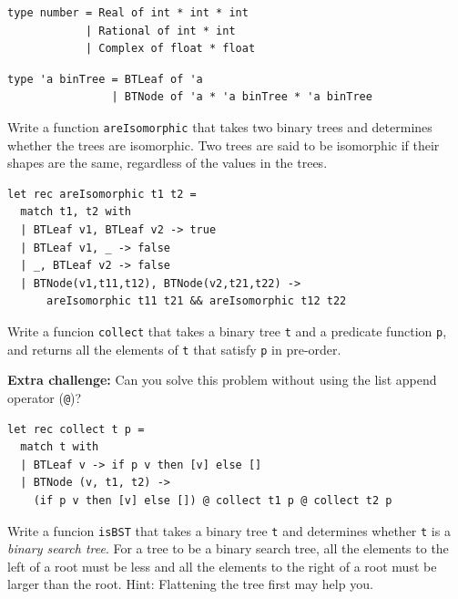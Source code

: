\documentclass[addpoints]{exam}
\begin{document}
\begin{questions}
  \begin{solutionbox}{2.5cm}
    \begin{verbatim}
type number = Real of int * int * int
            | Rational of int * int
            | Complex of float * float
    \end{verbatim}
  \end{solutionbox}

  
  \vspace{1em}
  \vspace{1em}

  \begin{verbatim}
type 'a binTree = BTLeaf of 'a
                | BTNode of 'a * 'a binTree * 'a binTree
  \end{verbatim}

  \question
  Write a function \texttt{areIsomorphic} that takes two binary trees and determines
  whether the trees are isomorphic. Two trees are said to be isomorphic if their shapes are the same,
  regardless of the values in the trees.

  \begin{solutionbox}{4.5cm}
    \begin{verbatim}
let rec areIsomorphic t1 t2 =
  match t1, t2 with
  | BTLeaf v1, BTLeaf v2 -> true
  | BTLeaf v1, _ -> false
  | _, BTLeaf v2 -> false
  | BTNode(v1,t11,t12), BTNode(v2,t21,t22) ->
      areIsomorphic t11 t21 && areIsomorphic t12 t22
    \end{verbatim}
  \end{solutionbox}


  \question
  Write a funcion \texttt{collect} that takes a binary tree \texttt{t} and 
  a predicate function \texttt{p}, and returns
  all the elements of \texttt{t} that satisfy \texttt{p} in pre-order.
  
  \textbf{Extra challenge:} Can you solve this problem without using the list append operator (\texttt{@})?

  \begin{solutionbox}{3.5cm}
    \begin{verbatim}
let rec collect t p =
  match t with
  | BTLeaf v -> if p v then [v] else []
  | BTNode (v, t1, t2) ->
    (if p v then [v] else []) @ collect t1 p @ collect t2 p
    \end{verbatim}
  \end{solutionbox}


  \question
  Write a funcion \texttt{isBST} that takes a binary tree \texttt{t} and 
  determines whether \texttt{t} is a \emph{binary search tree}.
  For a tree to be a binary search tree, 
  all the elements to the left of a root must be less and all the elements to the right of a 
  root must be larger than the root.
  Hint: Flattening the tree first may help you.


\end{questions}
\end{document}
